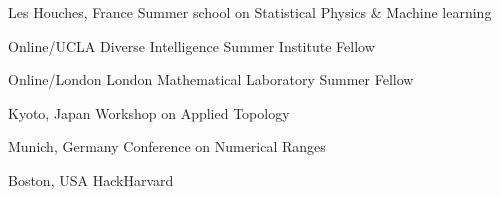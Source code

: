 {%
	Les Houches, France}
{
	Summer school on Statistical Physics \& Machine learning}
{}


{%
	Online/UCLA}
{%
	Diverse Intelligence Summer Institute Fellow}
{}

{%
	Online/London}
{%
	London Mathematical Laboratory Summer Fellow}
{}

{%
	Kyoto, Japan}
{%
	Workshop on Applied Topology}
{}

{%
	Munich, Germany}
{%
	Conference on Numerical Ranges}
{}

{%
	Boston, USA}
{%
	HackHarvard}
{}
